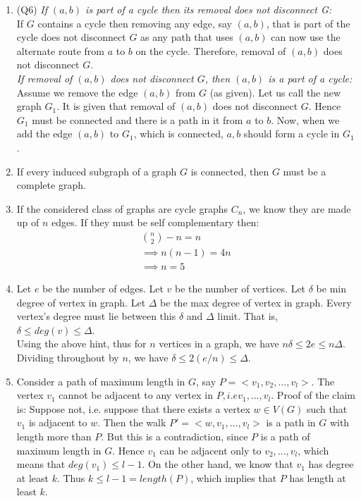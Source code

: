 \documentclass{article}
\begin{document}
\begin{enumerate}
\item (Q6) \textit{If $(a, b)$ is part of a cycle then its removal does not disconnect G:}\\
If $G$ contains a cycle then removing any edge, say $(a,b)$, that is part of the cycle does not disconnect $G$ as any path that uses $(a,b)$ can now use the alternate route from $a$ to $b$ on the cycle. Therefore, removal of $(a,b)$ does not disconnect $G$.\\

\textit{If removal of $(a,b)$ does not disconnect $G$, then $(a,b)$ is a part of a cycle:}\\
Assume we remove the edge $(a,b)$ from $G$ (as given). Let us call the new graph $G_1$. It is given that removal of $(a,b)$ does not disconnect $G$. Hence $G_1$ must be connected and there is a path in it from $a$ to $b$. Now, when we add the edge $(a,b)$ to $G_1$, which is connected, $a,b$ should form a cycle in $G_1$.  


\item If every induced subgraph of a graph $G$ is connected, then $G$ must be a complete graph.

\item If the considered class of graphs are cycle graphs $C_n$, we know they are made up of $n$ edges. If they must be self complementary then:
\begin{align*}
{n \choose 2} - n = n\\
\implies n(n-1) = 4n\\
\implies n=5
\end{align*}

\item Let $e$ be the number of edges. Let $v$ be the number of vertices. Let $\delta$ be min degree of vertex in graph. Let $\Delta$ be the max degree of vertex in graph. Every vertex's degree must lie between this $\delta$ and $\Delta$ limit. That is, $\delta \leq deg(v) \leq \Delta$.\\
Using the above hint, thus for $n$ vertices in a graph, we have  $n\delta \leq 2e \leq n\Delta$. Dividing throughout by $n$, we have $\delta \leq 2(e/n)\leq \Delta$. 



\item Consider a path of maximum length in $G$, say $P=<v_1, v_2, \dots , v_l>$.
The vertex $v_1$ cannot be adjacent to any vertex in $P , i.e {v_1, \dots , v_l}$. Proof of the claim is: Suppose not, i.e. suppose that there exists a vertex $w \in V(G)$ such that 
$v_1$ is adjacent to $w$. Then the walk $P'= <w, v_1, \dots , v_l>$ is a path in $G$ with length more than $P$. But this is a contradiction, since $P$ is a path of maximum length in $G$. Hence $v_1$ can be adjacent only to $v_2, \dots, v_l$, which means that $deg(v_1) \leq l-1$. On the other hand, we know that $v_1$ has degree at least $k$. Thus $k \leq l-1 = length(P)$, which implies that $P$ has length at least $k$.



\end{enumerate}
\end{document}
